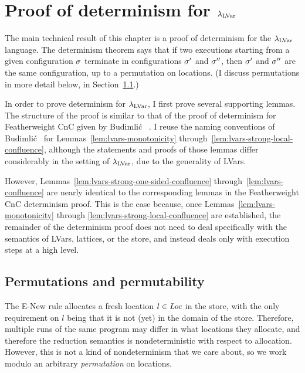 \section{Proof of determinism for
  $\lambda_{\textrm{LVar}}$}\label{s:lvars-proof}

The main technical result of this chapter is a proof of determinism
for the $\lambda_{\textrm{LVar}}$ language.  The determinism theorem says that if
two executions starting from a given configuration $\sigma$ terminate
in configurations $\sigma'$ and $\sigma''$, then $\sigma'$ and $\sigma''$
are the same configuration, up to a permutation on locations.  (I
discuss permutations in more detail below, in
Section~\ref{subsection:lvars-permutations}.)

In order to prove determinism for $\lambda_{\textrm{LVar}}$, I first prove several
supporting lemmas.  The structure of the proof is similar to that of
the proof of determinism for Featherweight CnC given by Budimli\'c
\etal~\cite{CnC}.  I reuse the naming conventions of Budimli\'c
\etal~for Lemmas~\ref{lem:lvars-monotonicity}
through~\ref{lem:lvars-strong-local-confluence}, although the
statements and proofs of those lemmas differ considerably in the
setting of $\lambda_{\textrm{LVar}}$, due to the generality of LVars.

However, Lemmas~\ref{lem:lvars-strong-one-sided-confluence}
through~\ref{lem:lvars-confluence} are nearly identical to the
corresponding lemmas in the Featherweight CnC determinism proof.  This
is the case because, once Lemmas~\ref{lem:lvars-monotonicity} through
\ref{lem:lvars-strong-local-confluence} are established, the remainder
of the determinism proof does not need to deal specifically with the
semantics of LVars, lattices, or the store, and instead deals only
with execution steps at a high level.


\subsection{Permutations and permutability}\label{subsection:lvars-permutations}

The {\sc E-New} rule allocates a fresh location $l \in \mathit{Loc}$ in the
store, with the only requirement on $l$ being that it is not (yet) in
the domain of the store.  Therefore, multiple runs of the same program
may differ in what locations they allocate, and therefore the
reduction semantics is nondeterministic with respect to allocation.
However, this is not a kind of nondeterminism that we care about, so
we work modulo an arbitrary \emph{permutation} on locations.

